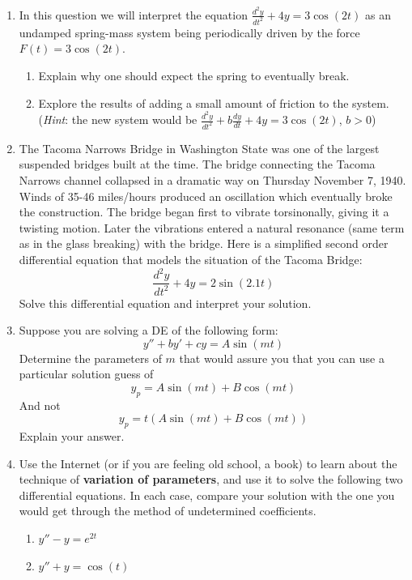 \begin{enumerate}
\clearpage

\item In this question we will interpret the equation $\displaystyle\frac{d^2y}{dt^2} + 4y = 3\cos(2t)$ as an undamped spring-mass system being periodically driven by the force $F(t) = 3\cos(2t)$. \label{13HWproblem6}
\begin{enumerate}
\item Explain why one should expect the spring to eventually break. \label{13HWproblem6parta}
\item Explore the results of adding a small amount of friction to the system. (\textit{Hint}: the new system would be $\displaystyle\frac{d^2y}{dt^2} + b\frac{dy}{dt} + 4y = 3\cos(2t)$, $b>0$) \label{13HWproblem6partb}
\end{enumerate}

\item The Tacoma Narrows Bridge in Washington State was one of the largest suspended bridges built at the time. The bridge connecting the Tacoma Narrows channel collapsed in a dramatic way on Thursday November 7, 1940. Winds of 35-46 miles/hours produced an oscillation which eventually broke the construction. The bridge began first to vibrate torsinonally, giving it a twisting motion. Later the vibrations entered a natural resonance (same term as in the glass breaking) with the bridge. Here is a simplified second order differential equation that models the situation of the Tacoma Bridge: \label{13HWproblem7}
\[
\frac{d^2y}{dt^2}+4y=2\sin(2.1t)
\]
Solve this differential equation and interpret your solution.

\item Suppose you are solving a DE of the following form: \label{13HWproblem8}
\[
y''+by'+cy=A\sin(mt)
\]
Determine the parameters of $m$ that would assure you that you can use a particular solution guess of
\[
y_p=A\sin(mt)+B\cos(mt)
\]
And not
\[
y_p=t(A\sin(mt)+B\cos(mt))
\]
Explain your answer.

\item Use the Internet (or if you are feeling old school, a book) to learn about the technique of \textbf{variation of parameters}, and use it to solve the following two differential equations. In each case, compare your solution with the one you would get through the method of undetermined coefficients. \label{13HWproblem9}
\begin{enumerate}
\item $y'' - y = e^{2t}$
\item $y'' + y = \cos(t)$
\end{enumerate}


\end{enumerate}




